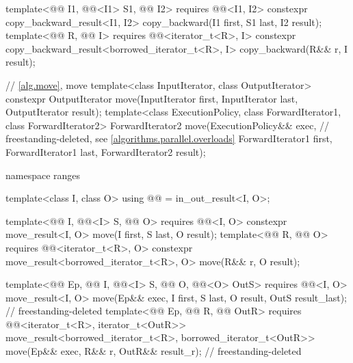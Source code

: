 \begin{codeblock}
{{    template<@@ I1, @@<I1> S1, @@ I2>
      requires @@<I1, I2>
      constexpr copy_backward_result<I1, I2>
        copy_backward(I1 first, S1 last, I2 result);
    template<@@ R, @@ I>
      requires @@<iterator_t<R>, I>
      constexpr copy_backward_result<borrowed_iterator_t<R>, I>
        copy_backward(R&& r, I result);
  }

  // \ref{alg.move}, move
  template<class InputIterator, class OutputIterator>
    constexpr OutputIterator move(InputIterator first, InputIterator last,
                                  OutputIterator result);
  template<class ExecutionPolicy, class ForwardIterator1,
           class ForwardIterator2>
    ForwardIterator2 move(ExecutionPolicy&& exec,               // freestanding-deleted, see \ref{algorithms.parallel.overloads}
                          ForwardIterator1 first, ForwardIterator1 last,
                          ForwardIterator2 result);

  namespace ranges {
    template<class I, class O>
      using @@ = in_out_result<I, O>;

    template<@@ I, @@<I> S, @@ O>
      requires @@<I, O>
      constexpr move_result<I, O>
        move(I first, S last, O result);
    template<@@ R, @@ O>
      requires @@<iterator_t<R>, O>
      constexpr move_result<borrowed_iterator_t<R>, O>
        move(R&& r, O result);

    template<@@ Ep, @@ I, @@<I> S,
             @@ O, @@<O> OutS>
      requires @@<I, O>
      move_result<I, O>
        move(Ep&& exec, I first, S last, O result, OutS result_last);       // freestanding-deleted
    template<@@ Ep, @@ R, @@ OutR>
      requires @@<iterator_t<R>, iterator_t<OutR>>
      move_result<borrowed_iterator_t<R>, borrowed_iterator_t<OutR>>
        move(Ep&& exec, R&& r, OutR&& result_r);                            // freestanding-deleted
  }

}
\end{codeblock}
